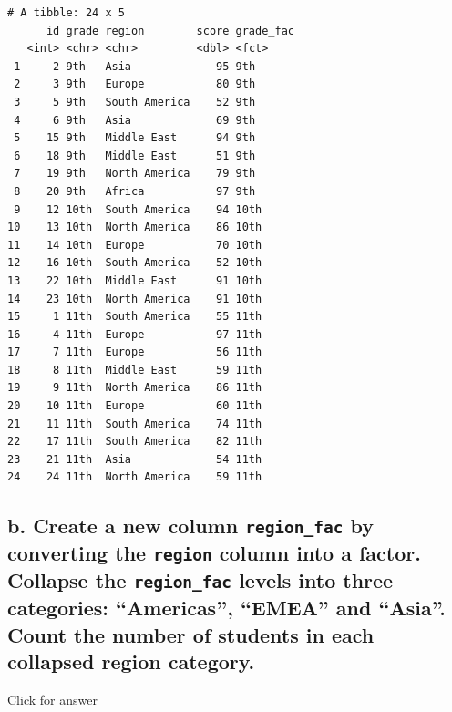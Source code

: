 \documentclass[
]{book}
\begin{document}
\begin{verbatim}
# A tibble: 24 x 5
      id grade region        score grade_fac
   <int> <chr> <chr>         <dbl> <fct>    
 1     2 9th   Asia             95 9th      
 2     3 9th   Europe           80 9th      
 3     5 9th   South America    52 9th      
 4     6 9th   Asia             69 9th      
 5    15 9th   Middle East      94 9th      
 6    18 9th   Middle East      51 9th      
 7    19 9th   North America    79 9th      
 8    20 9th   Africa           97 9th      
 9    12 10th  South America    94 10th     
10    13 10th  North America    86 10th     
11    14 10th  Europe           70 10th     
12    16 10th  South America    52 10th     
13    22 10th  Middle East      91 10th     
14    23 10th  North America    91 10th     
15     1 11th  South America    55 11th     
16     4 11th  Europe           97 11th     
17     7 11th  Europe           56 11th     
18     8 11th  Middle East      59 11th     
19     9 11th  North America    86 11th     
20    10 11th  Europe           60 11th     
21    11 11th  South America    74 11th     
22    17 11th  South America    82 11th     
23    21 11th  Asia             54 11th     
24    24 11th  North America    59 11th     
\end{verbatim}

\hypertarget{b.-create-a-new-column-region_fac-by-converting-the-region-column-into-a-factor.-collapse-the-region_fac-levels-into-three-categories-americas-emea-and-asia.-count-the-number-of-students-in-each-collapsed-region-category.}{%
\subsection{\texorpdfstring{b. Create a new column \texttt{region\_fac} by converting the \texttt{region} column into a factor. Collapse the \texttt{region\_fac} levels into three categories: ``Americas'', ``EMEA'' and ``Asia''. Count the number of students in each collapsed region category.}{b. Create a new column region\_fac by converting the region column into a factor. Collapse the region\_fac levels into three categories: ``Americas'', ``EMEA'' and ``Asia''. Count the number of students in each collapsed region category.}}\label{b.-create-a-new-column-region_fac-by-converting-the-region-column-into-a-factor.-collapse-the-region_fac-levels-into-three-categories-americas-emea-and-asia.-count-the-number-of-students-in-each-collapsed-region-category.}}

Click for answer
\end{document}
